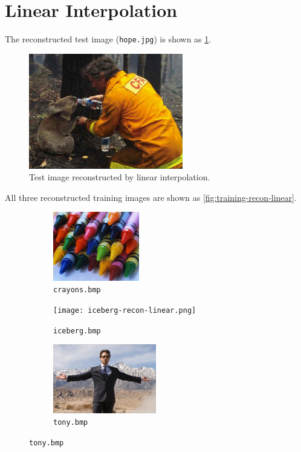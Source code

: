 \documentclass[12pt]{article}
\begin{document}
\section{Linear Interpolation}
	The reconstructed test image (\lstinline{hope.jpg}) is shown as \cref{fig:hope-recon-linear}.
	\begin{figure}[h]
		\centering
		\caption{Test image reconstructed by linear interpolation.}
		\label{fig:hope-recon-linear}
		\includegraphics[width=0.6\textwidth]{hope-recon-linear.png}
	\end{figure}

	All three reconstructed training images are shown as \cref{fig:training-recon-linear}.
	\begin{figure}[h]
		\centering
		\caption{Training images reconstructed by linear interpolation.}
		\label{fig:training-recon-linear}
		\begin{subfigure}[t]{0.3\textwidth}
			\centering
			\caption{\lstinline{crayons.bmp}}
			\label{fig:crayons-recon-linear}
			\includegraphics[height=3cm]{crayons-recon-linear.png}
		\end{subfigure}
		\hfill
		\begin{subfigure}[t]{0.3\textwidth}
			\centering
			\caption{\lstinline{iceberg.bmp}}
			\label{fig:iceberg-recon-linear}
			\texttt{[image: iceberg-recon-linear.png]}
		\end{subfigure}
		\hfill
		\begin{subfigure}[t]{0.3\textwidth}
			\centering
			\caption{\lstinline{tony.bmp}}
			\label{fig:tony-recon-linear}
			\includegraphics[height=3cm]{tony-recon-linear.png}
		\end{subfigure}
	\end{figure}
\end{document}
